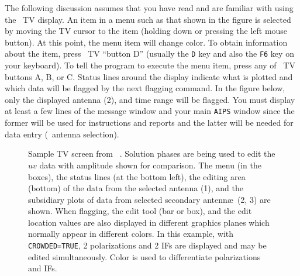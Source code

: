 The following discussion assumes that you have read  and are
familiar with using the \AIPS\ TV display.  An item in a menu such as
that shown in the figure is selected by moving the TV cursor to the
item (holding down or pressing the left mouse button).  At this point,
the menu item will change color.  To obtain information about the
item, press \AIPS\ TV ``button D'' (usually the {\tt D} key and also
the {\tt F6} key on your keyboard).  To tell the program to execute
the menu item, press any of \AIPS\ TV buttons A, B, or \hbox{C}.
Status lines around the display indicate what is plotted and which
data will be flagged by the next flagging command.  In the figure
below, only the displayed antenna (2), and time range will be flagged.
You must display at least a few lines of the message window and your
main {\tt AIPS} window since the former will be used for instructions
and reports and the latter will be needed for data entry (\eg\ antenna
selection).

\begin{figure}
\centering
{}
\caption[{\tt EDITA} display]{Sample TV screen from \hbox{{\tt
{}}}.  Solution phases are being used to edit the $uv$ data
with amplitude shown for comparison.  The {\tt {}} menu (in
the boxes), the status lines (at the bottom left), the editing area
(bottom) of the data from the selected antenna (1), and the subsidiary
plots of data from selected secondary antenn\ae\ (2, 3) are shown.
When flagging, the edit tool (bar or box), and  the edit location
values are also displayed in different graphics planes which normally
appear in different colors.  In this example, with {\tt CROWDED=TRUE},
2 polarizations and 2 IFs are displayed and may be edited
simultaneously.  Color is used to differentiate polarizations and
IFs.}
\label{fig:edita}
\end{figure}

